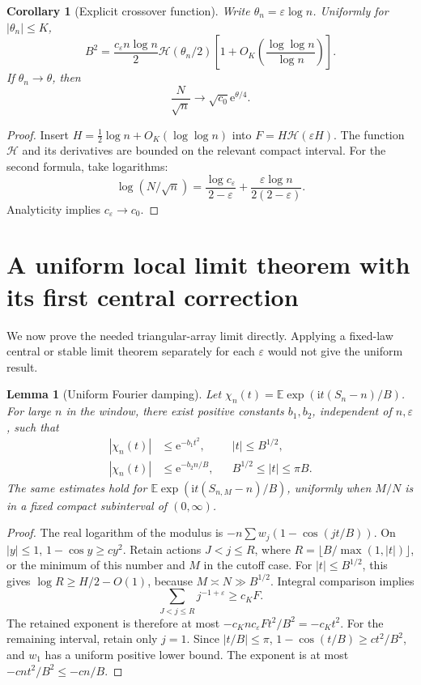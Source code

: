 \documentclass[11pt,a4paper]{article}
\numberwithin{equation}{section}
\newtheorem{lemma}[theorem]{Lemma}
\newtheorem{corollary}[theorem]{Corollary}
\theoremstyle{definition}
\theoremstyle{remark}
\newcommand{\eps}{\varepsilon}
\newcommand{\E}{\mathbb E}
\newcommand{\ee}{\mathrm e}
\newcommand{\ii}{\mathrm i}
\newcommand{\hc}{\mathcal H}
\begin{document}
\begin{corollary}[Explicit crossover function]
\label{cor:explicit-scales}
Write \(\theta_n=\eps\log n\). Uniformly for \(|\theta_n|\le K\),
\begin{equation}
 B^2=\frac{c_{\eps}n\log n}{2}\hc(\theta_n/2)
 \left[1+O_K\left(\frac{\log\log n}{\log n}\right)\right].
 \label{eq:B-explicit}
\end{equation}
If \(\theta_n\to\theta\), then
\begin{equation}
 \frac N{\sqrt n}\longrightarrow \sqrt{c_0}\ee^{\theta/4}.
 \label{eq:N-explicit}
\end{equation}
\end{corollary}
\begin{proof}
Insert \(H=\tfrac12\log n+O_K(\log\log n)\) into
\(F=H\hc(\eps H)\). The function \(\hc\) and its derivatives are bounded
on the relevant compact interval. For the second formula, take logarithms:
\[
 \log(N/\sqrt n)=\frac{\log c_{\eps}}{2-\eps}
       +\frac{\eps\log n}{2(2-\eps)}.
\]
Analyticity implies \(c_{\eps}\to c_0\).
\end{proof}

\section{A uniform local limit theorem with its first central correction}
\label{sec:coefficients}

We now prove the needed triangular-array limit directly. Applying a fixed-law
central or stable limit theorem separately for each \(\eps\) would not give
the uniform result.

\begin{lemma}[Uniform Fourier damping]
\label{lem:damping}
Let \(\chi_n(t)=\E\exp(\ii t(S_n-n)/B)\). For large \(n\) in the window,
there exist positive constants \(b_1,b_2\), independent of \(n,\eps\), such
that
\begin{align}
 |\chi_n(t)|&\le\ee^{-b_1t^2},&& |t|\le B^{1/2},\label{eq:damping-small}\\
 |\chi_n(t)|&\le\ee^{-b_2n/B},&& B^{1/2}\le|t|\le\pi B.
 \label{eq:damping-large}
\end{align}
The same estimates hold for
\(\E\exp(\ii t(S_{n,M}-n)/B)\), uniformly when \(M/N\) is in a fixed
compact subinterval of \((0,\infty)\).
\end{lemma}
\begin{proof}
The real logarithm of the modulus is
\(-n\sum w_j(1-\cos(jt/B))\). On \(|y|\le1\),
\(1-\cos y\ge c y^2\). Retain actions
\(J<j\le R\), where \(R=\lfloor B/\max(1,|t|)\rfloor\), or the
minimum of this number and \(M\) in the cutoff case.
For \(|t|\le B^{1/2}\), this gives \(\log R\ge H/2-O(1)\), because
\(M\asymp N\gg B^{1/2}\). Integral comparison implies
\[
 \sum_{J<j\le R}j^{-1+\eps}\ge c_K F.
\]
The retained exponent is therefore at most
\(-c_Knc_{\eps}Ft^2/B^2=-c_Kt^2\).
For the remaining interval, retain only \(j=1\).
Since \(|t/B|\le\pi\),
\(1-\cos(t/B)\ge c t^2/B^2\), and \(w_1\) has a uniform positive lower
bound. The exponent is at most \(-c nt^2/B^2\le-c n/B\).
\end{proof}
\end{document}
